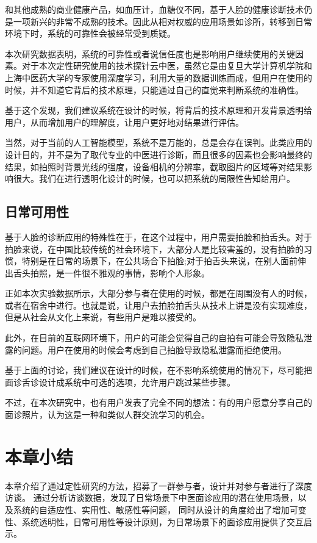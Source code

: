 和其他成熟的商业健康产品，如血压计，血糖仪不同，基于人脸的健康诊断技术仍是一项新兴的非常不成熟的技术。因此从相对权威的应用场景如诊所，转移到日常环境下时，系统的可靠性会被经常受到质疑。

本次研究数据表明，系统的可靠性或者说信任度也是影响用户继续使用的关键因素。对于本次定性研究使用的技术探针云中医，虽然它是由复旦大学计算机学院和上海中医药大学的专家使用深度学习，利用大量的数据训练而成，但用户在使用的时候，并不知道它背后的技术原理，只能通过自己的直觉来判断系统的准确性。

基于这个发现，我们建议系统在设计的时候，将背后的技术原理和开发背景透明给用户，从而增加用户的理解度，让用户更好地对结果进行评估。

当然，对于当前的人工智能模型，系统不是万能的，总是会存在误判。此类应用的设计目的，并不是为了取代专业的中医进行诊断，而且很多的因素也会影响最终的结果，如拍照时背景光线的强度，设备相机的分辨率，截取图片的区域等对结果影响很大。我们在进行透明化设计的时候，也可以把系统的局限性告知给用户。

\subsection{日常可用性}
基于人脸的诊断应用的特殊性在于，在这个过程中，用户需要拍脸和拍舌头。对于拍脸来说，在中国比较传统的社会环境下，大部分人是比较害羞的，没有拍脸的习惯，特别是在日常的场景下，在公共场合下拍脸;对于拍舌头来说，在别人面前伸出舌头拍照，是一件很不雅观的事情，影响个人形象。

正如本次实验数据所示，大部分参与者在使用的时候，都是在周围没有人的时候，或者在宿舍中进行。也就是说，让用户去拍脸拍舌头从技术上讲是没有实现难度，但是从社会从文化上来说，有些用户是难以接受的。

此外，在目前的互联网环境下，用户的可能会觉得自己的自拍有可能会导致隐私泄露的问题。用户在使用的时候会考虑到自己拍脸导致隐私泄露而拒绝使用。

基于上面的讨论，我们建议在设计的时候，在不影响系统使用的情况下，尽可能把面诊舌诊设计成系统中可选的选项，允许用户跳过某些步骤。

不过，在本次研究中，也有用户发表了完全不同的想法：有的用户愿意分享自己的面诊照片，认为这是一种和类似人群交流学习的机会。

\section{本章小结}


本章介绍了通过定性研究的方法，招募了一群参与者，设计并对参与者进行了深度访谈。
通过分析访谈数据，发现了日常场景下中医面诊应用的潜在使用场景，以及系统的自适应性、实用性、敏感性等问题，
同时从设计的角度给出了增加可变性、系统透明性，日常可用性等设计原则，为日常场景下的面诊应用提供了交互启示。










